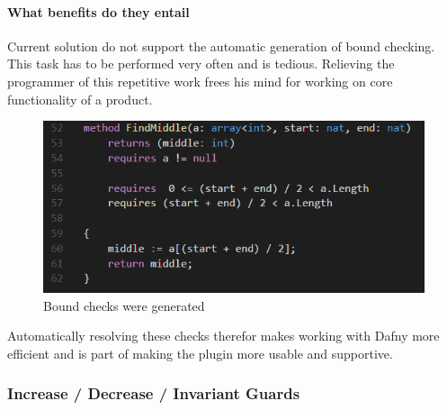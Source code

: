 \paragraph{What benefits do they entail}
Current solution do not support the automatic generation of bound checking. This task has to be performed very often and is tedious. Relieving the programmer of this repetitive work frees his mind for working on core functionality of a product. \newline
\begin{figure}[H]
	\centering
	\includegraphics[width=1\textwidth]{img/boundCheck}
	\caption{Bound checks were generated}
	\label{fig:dfindexInBound}
\end{figure}
Automatically resolving these checks therefor makes working with Dafny more efficient and is part of making the plugin more usable and supportive.
\subsubsection{Increase / Decrease / Invariant Guards}
